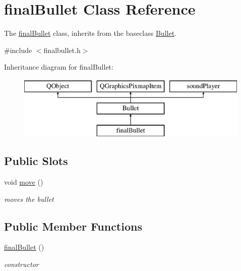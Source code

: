 \hypertarget{classfinalBullet}{}\section{final\+Bullet Class Reference}
\label{classfinalBullet}


The \hyperlink{classfinalBullet}{final\+Bullet} class, inherits from the baseclass \hyperlink{classBullet}{Bullet}.  




{\ttfamily \#include $<$finalbullet.\+h$>$}

Inheritance diagram for final\+Bullet\+:\begin{figure}[H]
\begin{center}
\leavevmode
\includegraphics[height=3.000000cm]{classfinalBullet}
\end{center}
\end{figure}
\subsection*{Public Slots}
\begin{DoxyCompactItemize}
\item 
\mbox{\label{classfinalBullet_aae61a14632d24b5dfc5ceec785b1d94b}} 
void \hyperlink{classfinalBullet_aae61a14632d24b5dfc5ceec785b1d94b}{move} ()
\begin{DoxyCompactList}\small\item\em moves the bullet \end{DoxyCompactList}\end{DoxyCompactItemize}
\subsection*{Public Member Functions}
\begin{DoxyCompactItemize}
\item 
\mbox{\label{classfinalBullet_aef126a4c178fe484b1766a2584ff3096}} 
\hyperlink{classfinalBullet_aef126a4c178fe484b1766a2584ff3096}{final\+Bullet} ()
\begin{DoxyCompactList}\small\item\em constructor \end{DoxyCompactList}\end{DoxyCompactItemize}


